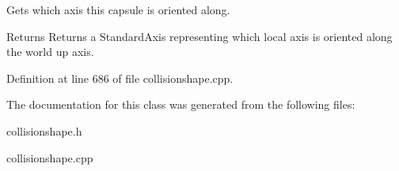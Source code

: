 Gets which axis this capsule is oriented along. 

\begin{DoxyReturn}{Returns}
Returns a StandardAxis representing which local axis is oriented along the world up axis. 
\end{DoxyReturn}


Definition at line 686 of file collisionshape.cpp.



The documentation for this class was generated from the following files:\begin{DoxyCompactItemize}
\item 
collisionshape.h\item 
collisionshape.cpp\end{DoxyCompactItemize}
